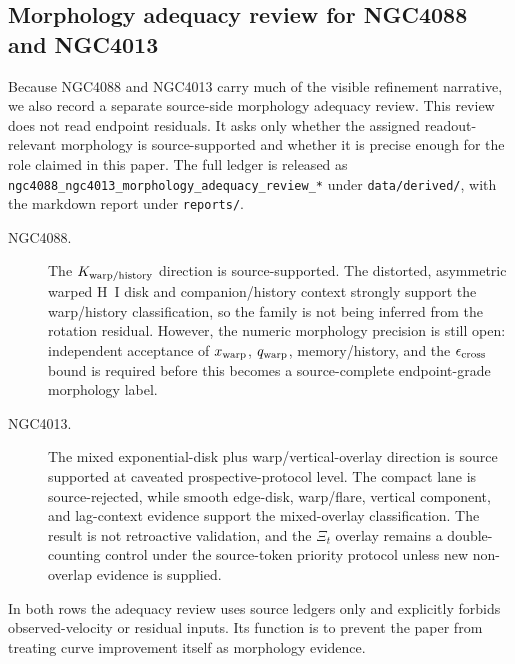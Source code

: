 \documentclass[11pt]{article}
\begin{document}
\subsection{Morphology adequacy review for NGC4088 and NGC4013}
\label{subsec:ngc4088-ngc4013-morphology-adequacy}

Because NGC4088 and NGC4013 carry much of the visible refinement narrative,
we also record a separate source-side morphology adequacy review.  This review
does not read endpoint residuals.  It asks only whether the assigned
readout-relevant morphology is source-supported and whether it is precise
enough for the role claimed in this paper.  The full ledger is released as
\texttt{ngc4088\_ngc4013\_morphology\_adequacy\_review\_*} under
\texttt{data/derived/}, with the markdown report under \texttt{reports/}.

\begin{description}
\item[NGC4088.]
The \(K_{\rm warp/history}\) direction is source-supported.  The distorted,
asymmetric warped H~I disk and companion/history context strongly support the
warp/history classification, so the family is not being inferred from the
rotation residual.  However, the numeric morphology precision is still open:
independent acceptance of \(x_{\rm warp}\), \(q_{\rm warp}\), memory/history,
and the \(\epsilon_{\rm cross}\) bound is required before this becomes a
source-complete endpoint-grade morphology label.

\item[NGC4013.]
The mixed exponential-disk plus warp/vertical-overlay direction is source
supported at caveated prospective-protocol level.  The compact lane is
source-rejected, while smooth edge-disk, warp/flare, vertical component, and
lag-context evidence support the mixed-overlay classification.  The result is
not retroactive validation, and the \(\Xi_t\) overlay remains a double-counting
control under the source-token priority protocol unless new non-overlap
evidence is supplied.
\end{description}

In both rows the adequacy review uses source ledgers only and explicitly
forbids observed-velocity or residual inputs.  Its function is to prevent the
paper from treating curve improvement itself as morphology evidence.
\end{document}
